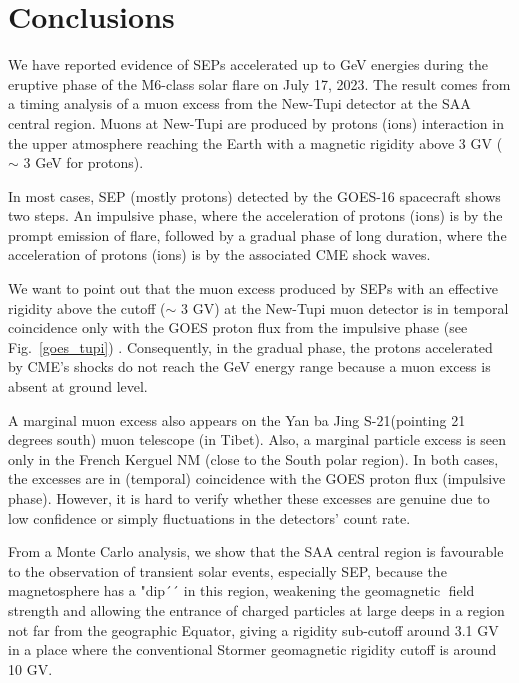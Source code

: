 \documentclass[twocolumn]{aastex63}
\begin{document}
 

\section{Conclusions}

We have reported evidence of SEPs accelerated up to GeV energies during the eruptive phase of the M6-class solar flare on July 17, 2023. The result comes from a timing analysis of a muon excess from the New-Tupi detector at the SAA central region. Muons at New-Tupi are produced by protons (ions) interaction in the upper atmosphere reaching the Earth with a magnetic rigidity above 3 GV ($\sim$ 3 GeV for protons).
 
In most cases, SEP (mostly protons) detected by the GOES-16 spacecraft shows two steps. An impulsive phase, where the acceleration of protons (ions) is by the prompt emission of flare, followed by a gradual phase of long duration, where the acceleration of protons (ions) is by the associated CME shock waves.

We want to point out that the muon excess produced by SEPs with an effective rigidity above the cutoff ($\sim$ 3 GV) at the New-Tupi muon detector is in temporal coincidence only with the GOES proton flux from the impulsive phase (see Fig.~\ref{goes_tupi}) . Consequently, in the gradual phase, the protons accelerated by CME's shocks do not reach the GeV energy range because a muon excess is absent at ground level.

A marginal muon excess also appears on the Yan ba Jing S-21(pointing 21 degrees south) muon telescope (in Tibet). Also, a marginal particle excess is seen only in the French Kerguel NM (close to the South polar region).
In both cases, the excesses are in (temporal) coincidence with the GOES proton flux (impulsive phase). However, it is hard to verify whether these excesses are genuine due to low confidence or simply fluctuations in the detectors' count rate.


From a Monte Carlo analysis,
we show that the SAA central region is favourable to the observation of transient solar events, especially SEP, because 
the magnetosphere  has a "dip´´ in this region, 
weakening the geomagnetic field strength and allowing the entrance of charged particles at large deeps in a region not far from the geographic Equator, giving a rigidity sub-cutoff around 3.1 GV in a place where the conventional Stormer geomagnetic rigidity cutoff is around 10 GV.
\end{document}
